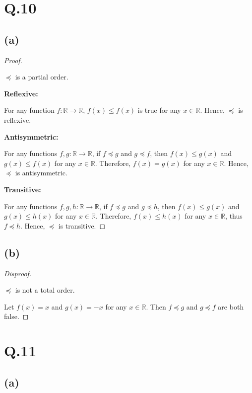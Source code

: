 \documentclass[a4paper,12pt]{article}
\begin{document}
\section*{Q.10}

\subsection*{(a)}

\begin{proof}
$ $

$\preceq$ is a partial order.

\textbf{Reflexive:}

For any function $f : \mathbb{R} \rightarrow \mathbb{R}$, $f(x) \leq f(x)$ is true for any $x \in \mathbb{R}$.
Hence, $\preceq$ is reflexive.

\textbf{Antisymmetric:}

For any functions $f, g : \mathbb{R} \rightarrow \mathbb{R}$, if $f \preceq g$ and $g \preceq f$, then $f(x) \leq g(x)$ and $g(x) \leq f(x)$ for any $x \in \mathbb{R}$.
Therefore, $f(x) = g(x)$ for any $x \in \mathbb{R}$.
Hence, $\preceq$ is antisymmetric.

\textbf{Transitive:}

For any functions $f, g, h : \mathbb{R} \rightarrow \mathbb{R}$, if $f \preceq g$ and $g \preceq h$, then $f(x) \leq g(x)$ and $g(x) \leq h(x)$ for any $x \in \mathbb{R}$.
Therefore, $f(x) \leq h(x)$ for any $x \in \mathbb{R}$, thus $f \preceq h$.
Hence, $\preceq$ is transitive.
\end{proof}

\subsection*{(b)}

\begin{proof}[Disproof]
$ $

$\preceq$ is not a total order.

Let $f(x) = x$ and $g(x) = -x$ for any $x \in \mathbb{R}$.
Then $f \preceq g$ and $g \preceq f$ are both false.
\end{proof}

\section*{Q.11}

\subsection*{(a)}
\end{document}
